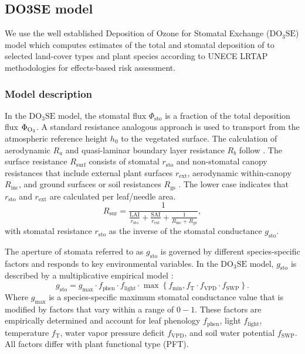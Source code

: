 \documentclass[bg, manuscript]{copernicus}
\begin{document}
\subsection{DO3SE model}
\label{sec:do3se}
We use the well established Deposition of Ozone for Stomatal Exchange ($\mathrm{DO_3SE}$) model \citep{ACP:Bueker2012} which computes estimates of the total and stomatal deposition of  to selected land-cover types and plant species according to UNECE LRTAP methodologies for effects-based risk assessment.

\subsubsection{Model description}
\label{subsec:model_describtion}

In the $\mathrm{DO_3SE}$ model, the stomatal  flux $\Phi_\mathrm{sto}$ is a fraction of the total  deposition flux $\Phi_\chem{O_3}$. A standard resistance analogous approach \citep{AE:Wesely1989} is used to transport  from the atmospheric reference height $h_0$ to the vegetated surface. The calculation of aerodynamic $R_a$ and quasi-laminar boundary layer resistance $R_b$ follow \citet{WASP:Simpson2003,ACP:Simpson2012}. The surface resistance $R_\mathrm{surf}$ consists of stomatal $r_\mathrm{sto}$ and non-stomatal canopy resistances that include external plant surfaces $r_\mathrm{ext}$, aerodynamic within-canopy $R_\mathrm{inc}$, and ground surfaces or soil resistances $R_\mathrm{gs}$ \citep{WASP:Simpson2003,ACP:Simpson2012}. The lower case indicates that $r_\mathrm{sto}$ and $r_\mathrm{ext}$ are calculated per leaf/needle area.
%
\begin{equation}
  R_\mathrm{sur} = \frac{1}{\frac{\mathrm{LAI}}{r_\mathrm{sto}}+\frac{\mathrm{SAI}}{r_\mathrm{ext}}+\frac{1}{R_\mathrm{inc}+R_\mathrm{gs}}},
\end{equation}
%
with stomatal resistance $r_\mathrm{sto}$ as the inverse of the stomatal conductance $g_\mathrm{sto}$.

The aperture of stomata referred to as $g_\mathrm{sto}$ is governed by different species-specific factors and responds to key environmental variables. In the $\mathrm{DO_3SE}$ model, $g_\mathrm{sto}$ is described by a multiplicative empirical model \citep{PTRS:Jarvis1976,Emberson2000,ICP:MappingManual2017}:
\begin{equation}
  g_\text{sto} = g_\text{max} \cdot f_\text{phen} \cdot f_\text{light} \cdot \max{\left\{f_\text{min}, f_\mathrm{T} \cdot f_\mathrm{VPD} \cdot f_\text{SWP}\right\}}.
  \label{eq:stomatal}
\end{equation}
%
Where $g_\mathrm{max}$ is a species-specific maximum stomatal conductance value that is modified by factors that vary within a range of $0-1$. These factors are empirically determined and account for leaf phenology $f_\text{phen}$, light $f_\text{light}$, temperature $f_\mathrm{T}$, water vapor pressure deficit $f_\mathrm{VPD}$, and soil water potential $f_\text{SWP}$. All factors differ with plant functional type (PFT).
\end{document}
